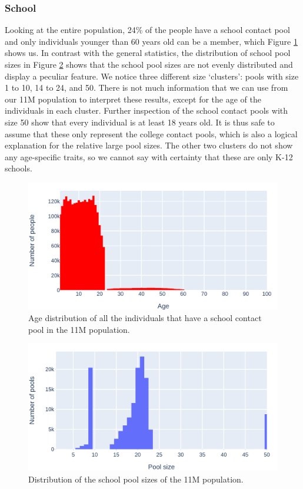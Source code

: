 \subsubsection{School}
Looking at the entire population, 24\% of the people have a school contact pool and only individuals younger than 60 years old can be a member, which Figure \ref{fig:school_age_distribution} shows us. In contrast with the general statistics, the distribution of school pool sizes in Figure \ref{fig:school_poolsize_distribution} shows that the school pool sizes are not evenly distributed and display a peculiar feature. We notice three different size `clusters': pools with size 1 to 10, 14 to 24, and 50. There is not much information that we can use from our 11M population to interpret these results, except for the age of the individuals in each cluster. Further inspection of the school contact pools with size 50 show that every individual is at least 18 years old. It is thus safe to assume that these only represent the college contact pools, which is also a logical explanation for the relative large pool sizes. The other two clusters do not show any age-specific traits, so we cannot say with certainty that these are only K-12 schools.

\begin{figure}
    \centering
    \includegraphics[width=.8\textwidth]{3 - Stride/fig/school_age_distribution.png}
    \caption{Age distribution of all the individuals that have a school contact pool in the 11M population.}
    \label{fig:school_age_distribution}
\end{figure}

\begin{figure}
    \centering
    \includegraphics[width=.8\textwidth]{3 - Stride/fig/school_poolsizes.png}
    \caption{Distribution of the school pool sizes of the 11M population.}
    \label{fig:school_poolsize_distribution}
\end{figure}

